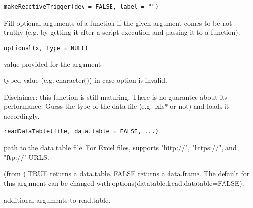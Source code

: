 \documentclass[letterpaper]{book}
\begin{document}
%
\begin{Usage}
\begin{verbatim}
makeReactiveTrigger(dev = FALSE, label = "")
\end{verbatim}
\end{Usage}
%
\begin{Description}\relax
Fill optional arguments of a function if the given argument comes to be not
truthy (e.g. by getting it after a script execution and passing it to a
function).
\end{Description}
%
\begin{Usage}
\begin{verbatim}
optional(x, type = NULL)
\end{verbatim}
\end{Usage}
%
\begin{Arguments}
\begin{ldescription}
\item[\code{x}] value provided for the argument

\item[\code{type}] typed value (e.g. character()) in case option is invalid.
\end{ldescription}
\end{Arguments}
%
\begin{Description}\relax
Disclaimer: this function is still maturing. There is no guarantee about its
performance.
Guess the type of the data file (e.g. .xls* or not) and loads it accordingly.
\end{Description}
%
\begin{Usage}
\begin{verbatim}
readDataTable(file, data.table = FALSE, ...)
\end{verbatim}
\end{Usage}
%
\begin{Arguments}
\begin{ldescription}
\item[\code{file}] path to the data table file. For Excel files,
supports "http://", "https://", and "ftp://" URLS.

\item[\code{data.table}] (from ) TRUE returns a data.table.
FALSE returns a data.frame. The default for this argument can
be changed with options(datatable.fread.datatable=FALSE).

\item[\code{...}] additional arguments to read.table.
\end{ldescription}
\end{Arguments}
\end{document}

